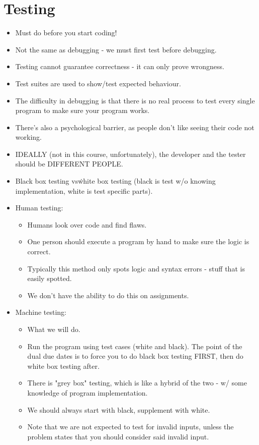 \documentclass{article}
\author{Clement Tsang}
\begin{document}
\section{Testing}
\begin{itemize}
\item Must do before you start coding!
\item Not the same as debugging - we must first test before debugging.
\item Testing cannot guarantee correctness - it can only prove wrongness.
\item Test suites are used to show/test expected behaviour.
\item The difficulty in debugging is that there is no real process to test every single program to make sure your program works.
\item There's also a psychological barrier, as people don't like seeing their code not working.
\item IDEALLY (not in this course, unfortunately), the developer and the tester should be DIFFERENT PEOPLE.
\item Black box testing vs\. white box testing (black is test w/o knowing implementation, white is test specific parts).

\item Human testing:
\begin{itemize}
\item Humans look over code and find flaws.
\item One person should execute a program by hand to make sure the logic is correct.
\item Typically this method only spots logic and syntax errors - stuff that is easily spotted.
\item We don't have the ability to do this on assignments.
\end{itemize}

\item Machine testing:

\begin{itemize}
\item What we will do.
\item Run the program using test cases (white and black).  The point of the dual due dates is to force you to do black box testing FIRST, then do white box testing after.
\item There is "grey box" testing, which is like a hybrid of the two - w/ some knowledge of program implementation.
\item We should always start with black, supplement with white.
\item Note that we are not expected to test for invalid inputs, unless the problem states that you should consider said invalid input.


\end{itemize}
\end{itemize}
\end{document}
